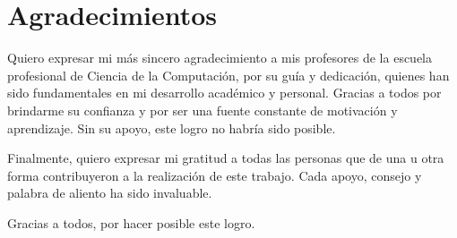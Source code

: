 \chapter*{\centering \huge Agradecimientos}

\vspace{0.9cm}
\justify

Quiero expresar mi más sincero agradecimiento a  mis profesores de la escuela profesional de Ciencia de la Computación, por su guía y dedicación, quienes han sido fundamentales en mi desarrollo académico y personal. Gracias a todos por brindarme su confianza y por ser una fuente constante de motivación y aprendizaje. Sin su apoyo, este logro no habría sido posible.
\vspace{0.75cm}

Finalmente, quiero expresar mi gratitud a todas las personas que de una u otra forma contribuyeron a la realización de este trabajo. Cada apoyo, consejo y palabra de aliento ha sido invaluable.
\vspace{0.75cm}

Gracias a todos, por hacer posible este logro.


\vspace{5cm}
